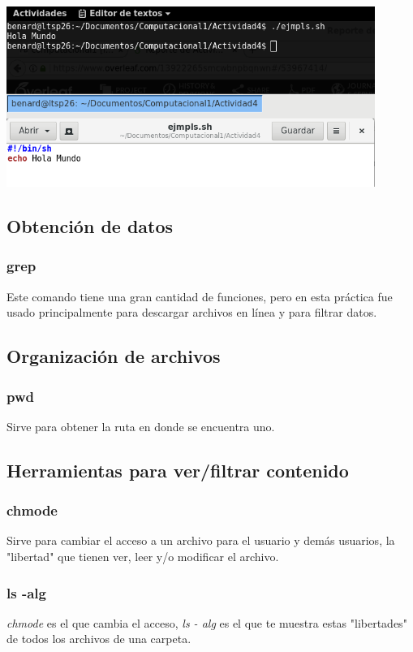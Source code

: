 \documentclass{article}
\begin{document}
\begin{center}
	\includegraphics[width=12cm]{echo.png}
\end{center}
\vspace{0.3cm}

\subsection*{Obtención de datos}

\subsubsection*{grep}
Este comando tiene una gran cantidad de funciones, pero en esta práctica fue usado principalmente para descargar archivos en línea y para filtrar datos.

\subsection*{Organización de archivos}

\subsubsection*{pwd}
Sirve para obtener la ruta en donde se encuentra uno.

\subsection*{Herramientas para ver/filtrar contenido}

\subsubsection*{chmode}
Sirve para cambiar el acceso a un archivo para el usuario y demás usuarios, la "libertad" que tienen ver, leer y/o modificar el archivo.

\subsubsection*{ls -alg}
\textit{chmode} es el que cambia el acceso, \textit{ls - alg} es el que te muestra estas "libertades" de todos los archivos de una carpeta.
\end{document}
